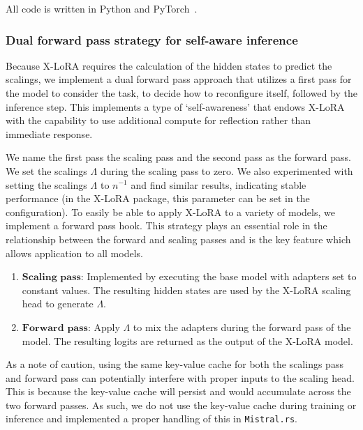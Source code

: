 All code is written in Python and PyTorch~\cite{Paszke2019PyTorchLibrary}. 


\subsubsection{Dual forward pass strategy for self-aware inference}
Because X-LoRA requires the calculation of the hidden states to predict the scalings, we implement a dual forward pass approach that utilizes a first pass for the model to consider the task, to decide how to reconfigure itself, followed by the inference step. This implements a type of `self-awareness' that endows X-LoRA with the capability to use additional compute for reflection rather than immediate response. 

We name the first pass the scaling pass and the second pass as the forward pass. We set the scalings $\Lambda$ during the scaling pass to zero. We  also experimented with setting the scalings $\Lambda$ to ${n}^{-1}$ and find similar results, indicating stable performance (in the X-LoRA package, this parameter can be set in the configuration). To easily be able to apply X-LoRA to a variety of models, we implement a forward pass hook. This strategy plays an essential role in the relationship between the forward and scaling passes and is the key feature which allows application to all models. 

\begin{enumerate}
    \item $\mathbf{Scaling}$ $\mathbf{pass}$: Implemented by executing the base model with adapters set to constant values. The resulting hidden states are used by the X-LoRA scaling head to generate $\Lambda$.
    \item $\mathbf{Forward}$ $\mathbf{pass}$: Apply $\Lambda$ to mix the adapters during the forward pass of the model. The resulting logits are returned as the output of the X-LoRA model.
\end{enumerate}

As a note of caution, using the same key-value cache for both the scalings pass and forward pass can potentially interfere with proper inputs to the scaling head. This is because the key-value cache will persist and would accumulate across the two forward passes. As such, we do not use the key-value cache during training or inference and implemented a proper handling of this in \texttt{Mistral.rs}.

